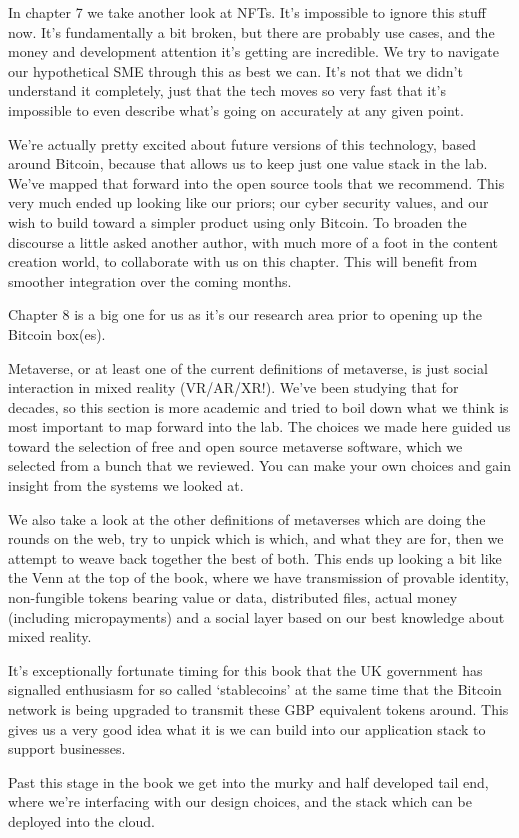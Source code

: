In chapter 7 we take another look at NFTs. It’s impossible to ignore this stuff now. It’s fundamentally a bit broken, but there are probably use cases, and the money and development attention it’s getting are incredible. We try to navigate our hypothetical SME through this as best we can. It’s not that we didn’t understand it completely, just that the tech moves so very fast that it’s impossible to even describe what’s going on accurately at any given point. \par
We’re actually pretty excited about future versions of this technology, based around Bitcoin, because that allows us to keep just one value stack in the lab. We’ve mapped that forward into the open source tools that we recommend. This very much ended up looking like our priors; our cyber security values, and our wish to build toward a simpler product using only Bitcoin. To broaden the discourse a little asked another author, with much more of a foot in the content creation world, to collaborate with us on this chapter. This will benefit from smoother integration over the coming months.\par
Chapter 8 is a big one for us as it’s our research area prior to opening up the Bitcoin box(es).\par Metaverse, or at least one of the current definitions of metaverse, is just social interaction in mixed reality (VR/AR/XR!). We’ve been studying that for decades, so this section is more academic and tried to boil down what we think is most important to map forward into the lab. The choices we made here guided us toward the selection of free and open source metaverse software, which we selected from a bunch that we reviewed. You can make your own choices and gain insight from the systems we looked at.\par
We also take a look at the other definitions of metaverses which are doing the rounds on the web, try to unpick which is which, and what they are for, then we attempt to weave back together the best of both. This ends up looking a bit like the Venn at the top of the book, where we have transmission of provable identity, non-fungible tokens bearing value or data, distributed files, actual money (including micropayments) and a social layer based on our best knowledge about mixed reality.\par
It's exceptionally fortunate timing for this book that the UK government has signalled enthusiasm for so called `stablecoins' at the same time that the Bitcoin network is being upgraded to transmit these GBP equivalent tokens around. This gives us a very good idea what it is we can build into our application stack to support businesses.\par 
Past this stage in the book we get into the murky and half developed tail end, where we’re interfacing with our design choices, and the stack which can be deployed into the cloud.


